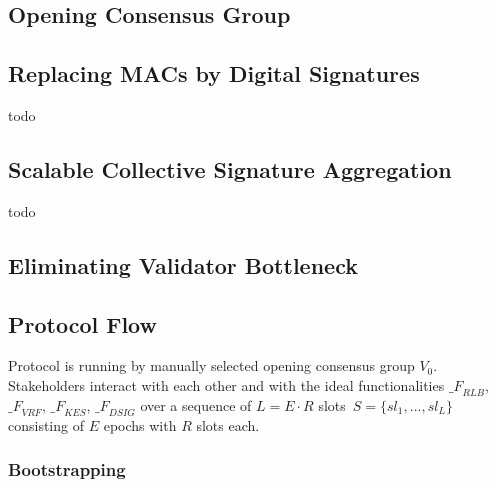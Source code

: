 \subsection{Opening Consensus Group}\label{subsec:opening-consensus-group-and-leaders}


\subsection{Replacing MACs by Digital Signatures}\label{subsec:replacing-macs-by-digital-signatures}

todo

\subsection{Scalable Collective Signature Aggregation}\label{subsec:scalable-collective-signature-aggregation}

todo

\subsection{Eliminating Validator Bottleneck}\label{subsec:eliminating-validator-bottleneck}


\subsection{Protocol Flow}\label{subsec:protocol-flow}
Protocol is running by manually selected opening consensus group $V_0$.
Stakeholders interact with each other and with the ideal functionalities ${\mathcal_{F}}_{RLB}$,\
${\mathcal_{F}}_{VRF}$, ${\mathcal_{F}}_{KES}$, ${\mathcal_{F}}_{DSIG}$ over a sequence of $L = E \cdot R$ slots\
${S=\{sl_1,...,sl_L\}}$ consisting of $E$ epochs with $R$ slots each.

\subsubsection{Bootstrapping}\label{subsubsec:bootstrapping}

